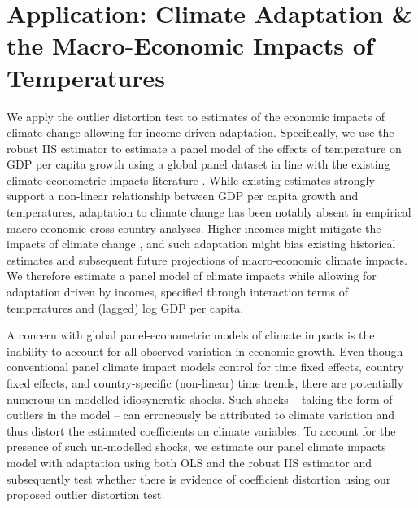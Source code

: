 \documentclass[11pt, letterpaper]{article}
\numberwithin{algorithm}{section}
\numberwithin{assumption}{section}
\numberwithin{lemma}{section}
\numberwithin{theorem}{section}
\numberwithin{corollary}{section}
\numberwithin{remark}{section}
\numberwithin{equation}{section}
\numberwithin{figure}{section}
\numberwithin{table}{section}
\begin{document}
\section{Application: Climate Adaptation \& \\ the Macro-Economic Impacts of Temperatures} \label{sec_application}
We apply the outlier distortion test to estimates of the economic impacts of climate change allowing for income-driven adaptation. Specifically, we use the robust IIS estimator to estimate a panel model of the effects of temperature on GDP per capita growth using a global panel dataset in line with the existing climate-econometric impacts literature \cite[e.g.][]{burke2015global, dell2012temperature, pretis2018uncertain}. While existing estimates strongly support a non-linear relationship between GDP per capita growth and temperatures, adaptation to climate change has been notably absent in empirical macro-economic cross-country analyses. Higher incomes might mitigate the impacts of climate change \citep[see e.g. ][]{acevedo2020effects, schwarz2020modelling}, and such adaptation might bias existing historical estimates and subsequent future projections of macro-economic climate impacts. We therefore estimate a panel model of climate impacts while allowing for adaptation driven by incomes, specified through interaction terms of temperatures and (lagged) log GDP per capita.

A concern with global panel-econometric models of climate impacts is the inability to account for all observed variation in economic growth. Even though conventional panel climate impact models control for time fixed effects, country fixed effects, and country-specific (non-linear) time trends, there are potentially numerous un-modelled idiosyncratic shocks. Such shocks -- taking the form of outliers in the model -- can erroneously be attributed to climate variation and thus distort the estimated coefficients on climate variables. To account for the presence of such un-modelled shocks, we estimate our panel climate impacts model with adaptation using both OLS and the robust IIS estimator and subsequently test whether there is evidence of coefficient distortion using our proposed outlier distortion test.
\end{document}
